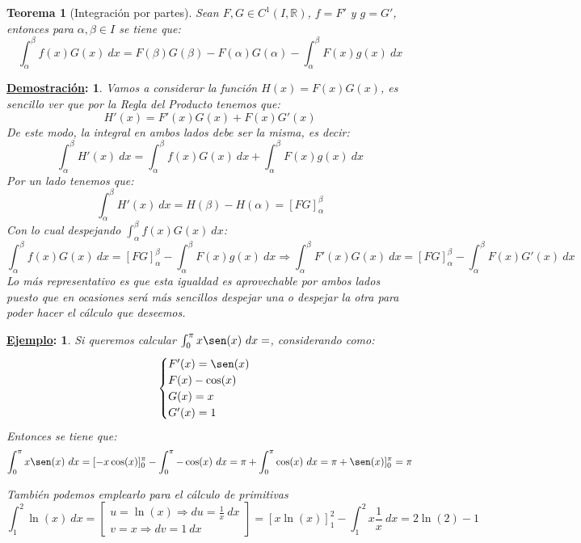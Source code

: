 \documentclass[10pt,a4paper,openright]{book}
\theoremstyle{break}
\newtheorem*{theo}{Teorema}
\newtheorem*{demo}{\underline{Demostración}:}
\newtheorem*{ej}{\underline{Ejemplo}:}
\newcommand{\dif}[1]{\ d#1}
\begin{document}
\begin{theo}[Integración por partes]
Sean $F,G\in C^1(I,\mathbb R)$, $f=F'$ y $g=G'$, entonces  para $\alpha,\beta\in I$ se tiene que:
$$\int_{\alpha}^{\beta} f(x)G(x)\dif{x} = F(\beta)G(\beta) - F(\alpha)G(\alpha)-\int_{\alpha}^{\beta} F(x)g(x)\dif{x}$$
\end{theo}
\begin{demo}
Vamos a considerar la función $H(x)=F(x)G(x)$, es sencillo ver que por la Regla del Producto tenemos que:
$$H'(x)=F'(x)G(x)+F(x)G'(x)$$
De este modo, la integral en ambos lados debe ser la misma, es decir:
$$\int_{\alpha}^{\beta} H'(x) \dif{x}= \int_{\alpha}^{\beta} f(x)G(x)\dif{x} + \int_{\alpha}^{\beta} F(x)g(x)\dif{x}$$
Por un lado tenemos que:
$$\int_{\alpha}^{\beta}H'(x)\dif{x} = H(\beta)-H(\alpha) = \left[FG\right]_\alpha^\beta$$
Con lo cual despejando $\displaystyle \int_{\alpha}^{\beta} f(x)G(x)\dif{x}$:
$$\int_{\alpha}^{\beta} f(x)G(x)\dif{x} = [FG]^\beta_\alpha - \int_{\alpha}^{\beta} F(x)g(x)\dif{x}\Rightarrow \int_{\alpha}^{\beta} F'(x)G(x)\dif{x} = [FG]^\beta_\alpha - \int_{\alpha}^{\beta} F(x)G'(x)\dif{x}$$
Lo más representativo es que esta igualdad es aprovechable por ambos lados puesto que en ocasiones será más sencillos despejar una o despejar la otra para poder hacer el cálculo que deseemos.
\end{demo}

\begin{ej}
Si queremos calcular $\int_0^\pi x\sen(x) \dif{x} =$, considerando como:
$$\begin{cases}F'(x)=\sen(x)\\ F(x)-\cos(x) \\ G(x)=x \\ G'(x) = 1 \end{cases}$$
Entonces se tiene que:
$$\int_0^\pi x\sen(x) \dif{x} = [-x\cos (x)]^\pi_0 - \int_0^\pi -\cos (x)\dif{x} = \pi + \int_0^\pi \cos (x)\dif{x} = \pi + \sen(x)]^\pi_0 = \pi$$

También podemos emplearlo para el cálculo de primitivas
$$\int_1^2 \ln(x) \dif{x} = \begin{bmatrix} u = \ln (x) \Rightarrow du =\frac{1}{x} \dif{x} \\ v = x \Rightarrow dv = 1\dif{x}\end{bmatrix} =[x\ln(x)]^2_1 - \int_1^2 x \frac{1}{x} \dif{x} = 2 \ln (2) - 1$$
\end{ej}
\end{document}

